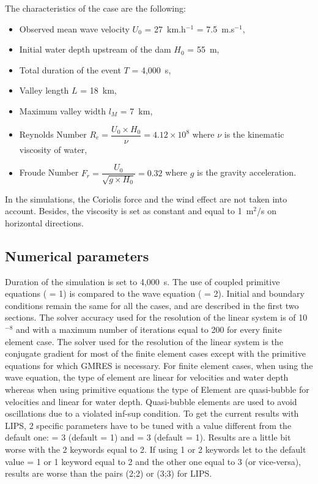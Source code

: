 The characteristics of the case are the following:
\begin{itemize}
  \itemsep0em
\item Observed mean wave velocity $U_0$ = 27~km.h$^{-1}$ = 7.5~m.s$^{-1}$,
\item Initial water depth upstream of the dam $H_0$ = 55~m,
\item Total duration of the event $T$ = 4,000~s,
\item Valley length $L$ = 18~km,
\item Maximum valley width $l_M$ = 7~km,
\item Reynolds Number \textbf{$R_e = \dfrac{U_0 \times H_0}{\nu} =  4.12 \times 10^8$}
where $\nu$ is the kinematic viscosity of water,
\item Froude Number \textbf{$F_r = \dfrac{U_0}{\sqrt{g \times H_0}} = 0.32$}
where $g$ is the gravity acceleration.
\end{itemize}

In the simulations, the Coriolis force and the wind effect are not taken into
account.
Besides, the viscosity is set as constant and equal to 1~m$^2$/s on horizontal
directions.

\subsection{Numerical parameters}
\label{subsection:malpasset:cases}
Duration of the simulation is set to 4,000~s.
The use of coupled primitive equations
( = 1)
is compared to the wave equation ( = 2).
Initial and boundary conditions remain the same for all the cases, and are
described in the first two sections.
The solver accuracy used for the resolution of the linear system is
of 10$^{-8}$ and with a maximum number of iterations equal to 200 for every finite
element case.
The solver used for the resolution of the linear system is the conjugate gradient
for most of the finite element cases except with the primitive equations for which
GMRES is necessary.
For finite element cases, when using the wave equation, the type of element are
linear for velocities and water depth whereas when using primitive equations the
type of Element are quasi-bubble for velocities and linear for water depth.
Quasi-bubble elements are used to avoid oscillations due to a violated inf-sup
condition.
To get the current results with LIPS, 2 specific parameters have to be tuned
with a value different from the default one:
 = 3 (default = 1) and
 = 3 (default = 1).
Results are a little bit worse with the 2 keywords equal to 2.
If using 1 or 2 keywords let to the default value = 1 or 1 keyword equal to 2
and the other one equal to 3 (or vice-versa), results are worse than
the pairs (2;2) or (3;3) for LIPS.

